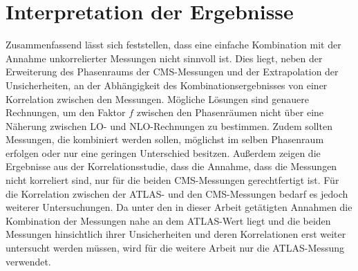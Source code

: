 \section{Interpretation der Ergebnisse}
Zusammenfassend lässt sich feststellen, dass eine einfache Kombination mit der Annahme unkorrelierter Messungen nicht sinnvoll ist. Dies liegt, neben der Erweiterung des Phasenraums der CMS-Messungen und der Extrapolation der Unsicherheiten, an der Abhängigkeit des Kombinationsergebnisses von einer Korrelation zwischen den Messungen.
Mögliche Lösungen sind genauere Rechnungen, um den Faktor $f$ zwischen den Phasenräumen nicht über eine Näherung zwischen LO- und NLO-Rechnungen zu bestimmen. Zudem sollten Messungen, die kombiniert werden sollen, möglichst im selben Phasenraum erfolgen oder nur eine geringen Unterschied besitzen.
Außerdem zeigen die Ergebnisse aus der Korrelationsstudie, dass die Annahme, dass die Messungen nicht korreliert sind, nur für die beiden CMS-Messungen gerechtfertigt ist. Für die Korrelation zwischen der ATLAS- und den CMS-Messungen bedarf es jedoch weiterer Untersuchungen.
Da unter den in dieser Arbeit getätigten Annahmen die Kombination der Messungen nahe an dem ATLAS-Wert liegt und die beiden Messungen hinsichtlich ihrer Unsicherheiten und deren Korrelationen erst weiter untersucht werden müssen, wird für die weitere Arbeit nur die ATLAS-Messung verwendet.
%
%
